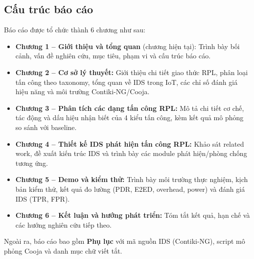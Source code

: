 \subsection{Cấu trúc báo cáo}
\label{subsec:structure}

Báo cáo được tổ chức thành 6 chương như sau:

\begin{itemize}
    \item \textbf{Chương 1 -- Giới thiệu và tổng quan} (chương hiện tại):
          Trình bày bối cảnh, vấn đề nghiên cứu, mục tiêu, phạm vi và
          cấu trúc báo cáo.

    \item \textbf{Chương 2 -- Cơ sở lý thuyết:} Giới thiệu chi tiết giao
          thức RPL, phân loại tấn công theo taxonomy, tổng quan về IDS
          trong IoT, các chỉ số đánh giá hiệu năng và môi trường
          Contiki-NG/Cooja.

    \item \textbf{Chương 3 -- Phân tích các dạng tấn công RPL:} Mô tả
          chi tiết cơ chế, tác động và dấu hiệu nhận biết của 4 kiểu
          tấn công, kèm kết quả mô phỏng so sánh với baseline.

    \item \textbf{Chương 4 -- Thiết kế IDS phát hiện tấn công RPL:}
          Khảo sát related work, đề xuất kiến trúc IDS và trình bày
          các module phát hiện/phòng chống tương ứng.

    \item \textbf{Chương 5 -- Demo và kiểm thử:} Trình bày môi trường
          thực nghiệm, kịch bản kiểm thử, kết quả đo lường (PDR, E2ED,
          overhead, power) và đánh giá IDS (TPR, FPR).

    \item \textbf{Chương 6 -- Kết luận và hướng phát triển:} Tóm tắt
          kết quả, hạn chế và các hướng nghiên cứu tiếp theo.
\end{itemize}

Ngoài ra, báo cáo bao gồm \textbf{Phụ lục} với mã nguồn IDS
(Contiki-NG), script mô phỏng Cooja và danh mục chữ viết tắt.